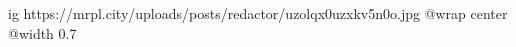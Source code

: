 
 
 
 
 

\ifcmt
  ig https://mrpl.city/uploads/posts/redactor/uzolqx0uzxkv5n0o.jpg
  @wrap center
  @width 0.7
\fi
